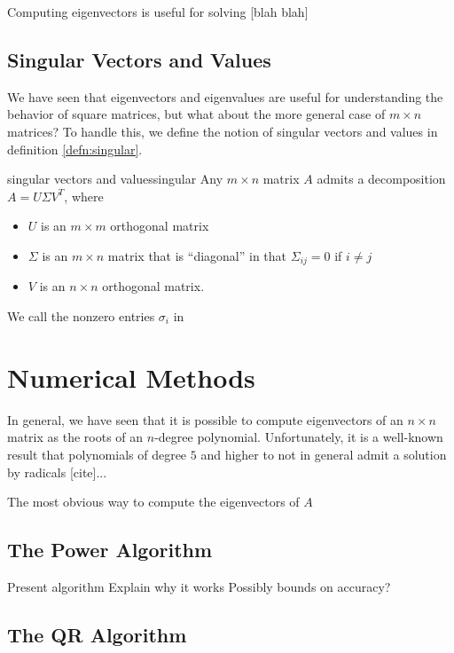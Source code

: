 \documentclass{article}
\begin{document}
Computing eigenvectors is useful for solving [blah blah]

\subsection{Singular Vectors and Values}
We have seen that eigenvectors and eigenvalues are useful for understanding the behavior of square matrices, but what about the more general case of $m \times n$ matrices? To handle this, we define the notion of singular vectors and values in definition \ref{defn:singular}.

\begin{definition}{singular vectors and values}{singular}
  Any $m \times n$ matrix $A$ admits a decomposition $A = U \Sigma V^T$, where
  \begin{itemize}
    \item $U$ is an $m \times m$ orthogonal matrix
    \item $\Sigma$ is an $m \times n$ matrix that is ``diagonal'' in that $\Sigma_{ij} = 0$ if $i \neq j$
    \item $V$ is an $n \times n$ orthogonal matrix.
  \end{itemize}
  We call the nonzero entries $\sigma_i$ in
\end{definition}

\section{Numerical Methods}
In general, we have seen that it is possible to compute eigenvectors of an $n \times n$ matrix as the roots of an $n$-degree polynomial. Unfortunately, it is a well-known result that polynomials of degree $5$ and higher to not in general admit a solution by radicals [cite]...

The most obvious way to compute the eigenvectors of $A$

\subsection{The Power Algorithm}
Present algorithm
Explain why it works
Possibly bounds on accuracy?

\subsection{The QR Algorithm}
\end{document}
